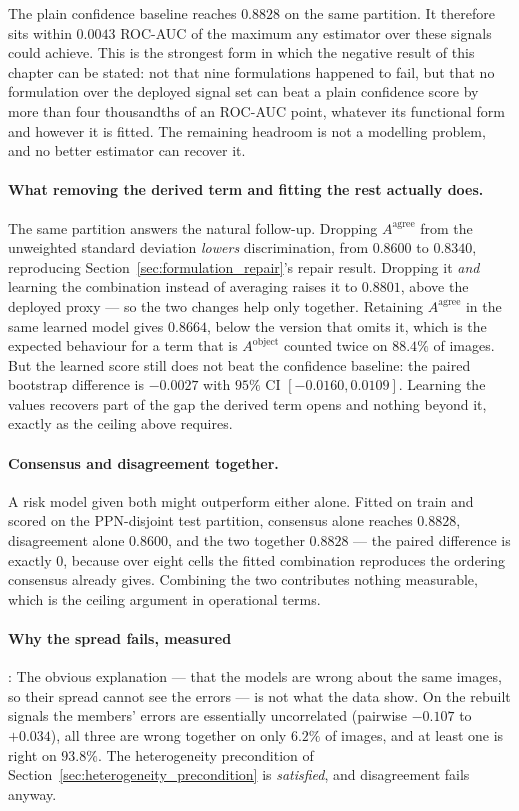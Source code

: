 \documentclass[12pt,a4paper]{report}
\begin{document}
The plain confidence baseline reaches $0.8828$ on the same partition. It therefore sits within
$\mathbf{0.0043}$ ROC-AUC of the maximum any estimator over these signals could achieve. This is
the strongest form in which the negative result of this chapter can be stated: not that nine
formulations happened to fail, but that no formulation over the deployed signal set can beat a
plain confidence score by more than four thousandths of an ROC-AUC point, whatever its
functional form and however it is fitted. The remaining headroom is not a modelling problem, and
no better estimator can recover it.

\paragraph{What removing the derived term and fitting the rest actually does.} The same partition
answers the natural follow-up. Dropping $A^{\text{agree}}$ from the unweighted standard deviation
\emph{lowers} discrimination, from $0.8600$ to $0.8340$, reproducing
Section~\ref{sec:formulation_repair}'s repair result. Dropping it \emph{and} learning the
combination instead of averaging raises it to $0.8801$, above the deployed proxy --- so the two
changes help only together. Retaining $A^{\text{agree}}$ in the same learned model gives $0.8664$,
below the version that omits it, which is the expected behaviour for a term that is
$A^{\text{object}}$ counted twice on $88.4\%$ of images. But the learned score still does not beat
the confidence baseline: the paired bootstrap difference is $-0.0027$ with $95\%$ CI
$[-0.0160, 0.0109]$. Learning the values recovers part of the gap the derived term opens and
nothing beyond it, exactly as the ceiling above requires.

\paragraph{Consensus and disagreement together.} A risk model given both might outperform either
alone. Fitted on train and scored on the PPN-disjoint test partition, consensus alone reaches
$0.8828$, disagreement alone $0.8600$, and the two together $0.8828$ --- the paired difference is
exactly $0$, because over eight cells the fitted combination reproduces the ordering consensus
already gives. Combining the two contributes nothing measurable, which is the ceiling argument in
operational terms.

\paragraph{Why the spread fails, measured}: The obvious explanation --- that the models are
wrong about the same images, so their spread cannot see the errors --- is not what the data show.
On the rebuilt signals the members' errors are essentially uncorrelated (pairwise $-0.107$ to
$+0.034$), all three are wrong together on only $6.2\%$ of images, and at least one is right on
$93.8\%$. The heterogeneity precondition of Section~\ref{sec:heterogeneity_precondition} is
\emph{satisfied}, and disagreement fails anyway.
\end{document}
